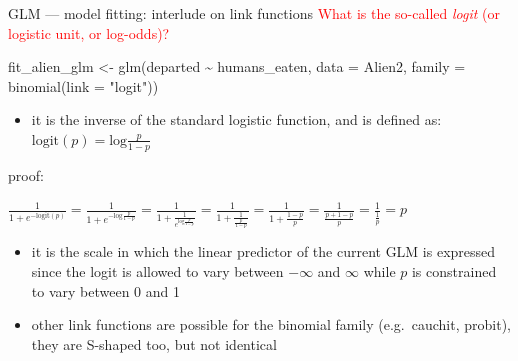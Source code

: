 \documentclass[
  10pt,
  ignorenonframetext,
  aspectratio=169,
  t]{beamer}
\newenvironment{Shaded}{\begin{snugshade}}{\end{snugshade}}
\newcommand{\AttributeTok}[1]{\textcolor[rgb]{0.40,0.45,0.13}{#1}}
\newcommand{\FunctionTok}[1]{\textcolor[rgb]{0.28,0.35,0.67}{#1}}
\newcommand{\NormalTok}[1]{\textcolor[rgb]{0.00,0.23,0.31}{#1}}
\newcommand{\OtherTok}[1]{\textcolor[rgb]{0.00,0.23,0.31}{#1}}
\newcommand{\SpecialCharTok}[1]{\textcolor[rgb]{0.37,0.37,0.37}{#1}}
\newcommand{\StringTok}[1]{\textcolor[rgb]{0.13,0.47,0.30}{#1}}
\providecommand{\tightlist}{%
  \setlength{\itemsep}{0pt}\setlength{\parskip}{0pt}}
\newcommand{\blueit}[1]{\textcolor{bluebeamer}{\emph{#1}}}
\begin{document}
\begin{frame}[fragile]{GLM --- model fitting: interlude on link
functions}
\protect{}\label{glm-model-fitting-interlude-on-link-functions}
\textcolor{red}{What is the so-called \blueit{logit} (or logistic unit, or log-odds)?}

\vspace{1em}

\footnotesize

\begin{Shaded}
\begin{Highlighting}[]
\NormalTok{fit\_alien\_glm }\OtherTok{\textless{}{-}} \FunctionTok{glm}\NormalTok{(departed }\SpecialCharTok{\textasciitilde{}}\NormalTok{ humans\_eaten, }\AttributeTok{data =}\NormalTok{ Alien2, }\AttributeTok{family =} \FunctionTok{binomial}\NormalTok{(}\AttributeTok{link =} \StringTok{"logit"}\NormalTok{))}
\end{Highlighting}
\end{Shaded}

\normalsize

\begin{itemize}
\tightlist
\item
  it is the inverse of the standard logistic function, and is defined
  as: \(\text{logit}(p) = \text{log}\frac{p}{1-p}\)
\end{itemize}

proof:

\(\frac{1}{1+e^{-\text{logit}(p)}} = \frac{1}{1+e^{-\text{log}\frac{p}{1-p}}}=\frac{1}{1+\frac{1}{e^{\text{log}\frac{p}{1-p}}}}=\frac{1}{1+\frac{1}{\frac{p}{1-p}}}=\frac{1}{1+\frac{1-p}{p}}=\frac{1}{\frac{p+1-p}{p}}=\frac{1}{\frac{1}{p}}=p\)

\pause

\begin{itemize}
\item
  it is the scale in which the linear predictor of the current GLM is
  expressed since the logit is allowed to vary between \(-\infty\) and
  \(\infty\) while \(p\) is constrained to vary between 0 and 1
\item
  other link functions are possible for the binomial family
  (e.g.~cauchit, probit), they are S-shaped too, but not identical
\end{itemize}
\end{frame}
\end{document}
